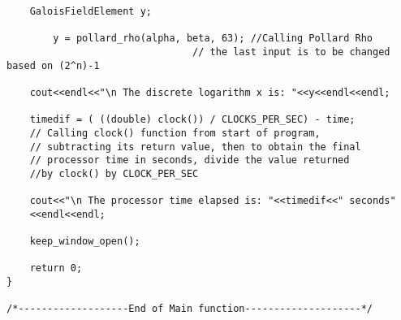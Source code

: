 \documentclass[iwp,first]{luthesis}
\begin{document}
\begin{verbatim}
    GaloisFieldElement y;

	    y = pollard_rho(alpha, beta, 63); //Calling Pollard Rho
							    // the last input is to be changed based on (2^n)-1

    cout<<endl<<"\n The discrete logarithm x is: "<<y<<endl<<endl;
    
    timedif = ( ((double) clock()) / CLOCKS_PER_SEC) - time; 
    // Calling clock() function from start of program, 
    // subtracting its return value, then to obtain the final 
    // processor time in seconds, divide the value returned 
    //by clock() by CLOCK_PER_SEC
    
    cout<<"\n The processor time elapsed is: "<<timedif<<" seconds"
    <<endl<<endl;
    
    keep_window_open();
    
    return 0;
}       

/*-------------------End of Main function--------------------*/


\end{verbatim}
\end{document}
